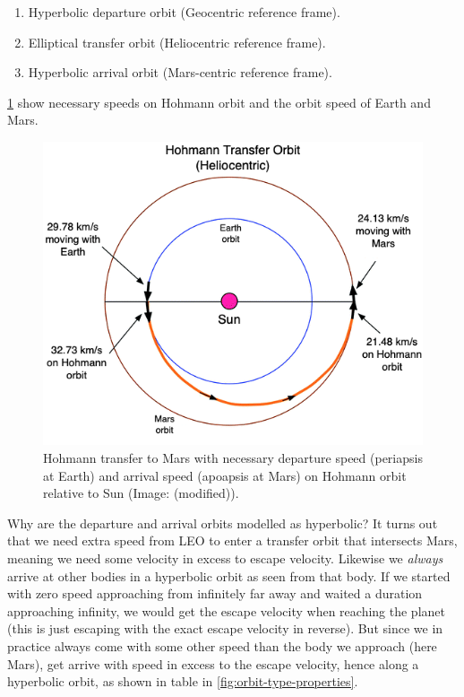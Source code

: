 \begin{enumerate}
	\item Hyperbolic departure orbit (Geocentric reference frame).
	\item Elliptical transfer orbit (Heliocentric reference frame).
	\item Hyperbolic arrival orbit (Mars-centric reference frame).
\end{enumerate}

\cref{fig:Hohmann-to-mars-heliocentric} show necessary speeds on Hohmann orbit and the orbit speed of Earth and Mars. 

\begin{figure}[ht]
    \centering
    \includegraphics[width=0.7\linewidth]{fig/Hohmann-to-mars-heliocentric.png}
    \caption{Hohmann transfer to Mars with necessary departure speed (periapsis at Earth) and arrival speed (apoapsis at Mars) on Hohmann orbit relative to Sun (Image: \cite{Rapp2016} (modified)).}
    \label{fig:Hohmann-to-mars-heliocentric}
\end{figure}


Why are the departure and arrival orbits modelled as hyperbolic? It turns out that we need extra speed from LEO to enter a transfer orbit that intersects Mars, meaning we need some velocity in excess to escape velocity. Likewise we \emph{always} arrive at other bodies in a hyperbolic orbit as seen from that body. If we started with zero speed approaching from infinitely far away and waited a duration approaching infinity, we would get the escape velocity when reaching the planet (this is just escaping with the exact escape velocity in reverse). But since we in practice always come with some other speed than the body we approach (here Mars), get arrive with speed in excess to the escape velocity, hence along a hyperbolic orbit, as shown in table in \cref{fig:orbit-type-properties}.

